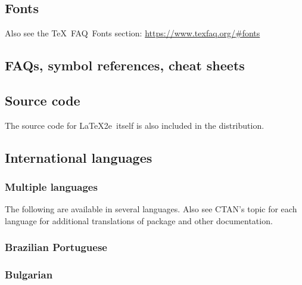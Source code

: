 \documentclass{article}
\def\FAQ{\acro{FAQ}}
\newcommand{\acro}[1]{\textsc{\MakeLowercase{#1}}}
\def\TeX{TeX}%
\def\LaTeXe{LaTeX2e}%
\def\acro#1{#1}%
\renewcommand*{\TeX}{TeX}
\begin{document}
\subsection{Fonts}

Also see the \TeX\ FAQ\ Fonts section: \url{https://www.texfaq.org/#fonts}

\printbibliography[
    heading=none,
    category=font,
]


\subsection{\FAQ{}s, symbol references, cheat sheets}

\printbibliography[
    heading=none,
    category=FAQ,
]


\subsection{Source code}

The source code for \LaTeXe\ itself is also included in the distribution.

\printbibliography[
    heading=none,
    category=source,
]


\subsection{International languages}
\label{sec:international}

\subsubsection{Multiple languages}

    The following are available in several languages.
    Also see CTAN's topic for each language for additional translations of
    package and other documentation.

        \printbibliography[
            heading=none,
            category=langmultiple,
        ]

\subsubsection{Brazilian Portuguese}
        \printbibliography[
            heading=none,
            category=brazilian,
        ]

\subsubsection{Bulgarian}
        \printbibliography[
            heading=none,
            category=bulgarian,
        ]
\end{document}
